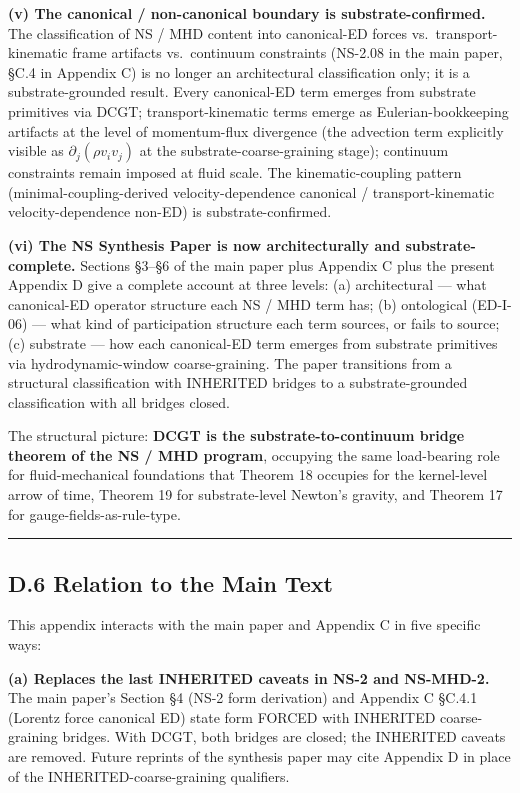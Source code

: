 \documentclass[
  11pt,a4paper]{article}
\begin{document}
\textbf{(v) The canonical / non-canonical boundary is
substrate-confirmed.} The classification of NS / MHD content into
canonical-ED forces vs.~transport-kinematic frame artifacts
vs.~continuum constraints (NS-2.08 in the main paper, §C.4 in Appendix
C) is no longer an architectural classification only; it is a
substrate-grounded result. Every canonical-ED term emerges from
substrate primitives via DCGT; transport-kinematic terms emerge as
Eulerian-bookkeeping artifacts at the level of momentum-flux divergence
(the advection term explicitly visible as \(\partial_j(\rho v_iv_j)\) at
the substrate-coarse-graining stage); continuum constraints remain
imposed at fluid scale. The kinematic-coupling pattern
(minimal-coupling-derived velocity-dependence canonical /
transport-kinematic velocity-dependence non-ED) is substrate-confirmed.

\textbf{(vi) The NS Synthesis Paper is now architecturally and
substrate-complete.} Sections §3--§6 of the main paper plus Appendix C
plus the present Appendix D give a complete account at three levels: (a)
architectural --- what canonical-ED operator structure each NS / MHD
term has; (b) ontological (ED-I-06) --- what kind of participation
structure each term sources, or fails to source; (c) substrate --- how
each canonical-ED term emerges from substrate primitives via
hydrodynamic-window coarse-graining. The paper transitions from a
structural classification with INHERITED bridges to a substrate-grounded
classification with all bridges closed.

The structural picture: \textbf{DCGT is the substrate-to-continuum
bridge theorem of the NS / MHD program}, occupying the same load-bearing
role for fluid-mechanical foundations that Theorem 18 occupies for the
kernel-level arrow of time, Theorem 19 for substrate-level Newton's
gravity, and Theorem 17 for gauge-fields-as-rule-type.

\begin{center}\rule{0.5\linewidth}{0.5pt}\end{center}

\subsection{D.6 Relation to the Main
Text}\label{d.6-relation-to-the-main-text}

This appendix interacts with the main paper and Appendix C in five
specific ways:

\textbf{(a) Replaces the last INHERITED caveats in NS-2 and NS-MHD-2.}
The main paper's Section §4 (NS-2 form derivation) and Appendix C §C.4.1
(Lorentz force canonical ED) state form FORCED with INHERITED
coarse-graining bridges. With DCGT, both bridges are closed; the
INHERITED caveats are removed. Future reprints of the synthesis paper
may cite Appendix D in place of the INHERITED-coarse-graining
qualifiers.
\end{document}
